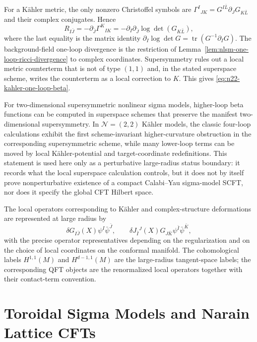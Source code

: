 For a K\"ahler metric, the only nonzero Christoffel symbols are
\(\Gamma^I{}_{JK}=G^{I\bar L}\partial_JG_{K\bar L}\) and their complex
conjugates.  Hence
\[
  R_{I\bar J}
  =
  -\partial_{\bar J}\Gamma^K{}_{IK}
  =
  -\partial_I\partial_{\bar J}\log\det(G_{K\bar L}),
\]
where the last equality is the matrix identity
\(\partial_I\log\det G=\operatorname{tr}(G^{-1}\partial_IG)\).  The
background-field one-loop divergence is the restriction of
Lemma~\ref{lem:nlsm-one-loop-ricci-divergence} to complex
coordinates.  Supersymmetry rules out a local metric counterterm that is not
of type \((1,1)\) and, in the stated superspace scheme, writes the
counterterm as a local correction to \(K\).  This gives
\eqref{eq:n22-kahler-one-loop-beta}.

\begin{remark}
\label{rem:supersymmetric-nlsm-higher-loop-status}
For two-dimensional supersymmetric nonlinear sigma models, higher-loop beta
functions can be computed in superspace schemes that preserve the manifest
two-dimensional supersymmetry.  In \(\mathcal N=(2,2)\) K\"ahler models, the
classic four-loop calculations exhibit the first scheme-invariant
higher-curvature obstruction in the corresponding supersymmetric scheme,
while many lower-loop terms can be moved by local K\"ahler-potential and
target-coordinate redefinitions.  This statement is used here only as a
perturbative large-radius status boundary: it records what the local
superspace calculation controls, but it does not by itself prove
nonperturbative existence of a compact Calabi--Yau sigma-model SCFT, nor
does it specify the global CFT Hilbert space.
\end{remark}

The local operators corresponding to K\"ahler and complex-structure
deformations are represented at large radius by
\[
  \delta G_{I\bar J}(X)\psi^I\bar\psi^{\bar J},
  \qquad
  \delta J_{\bar I}{}^J(X)G_{J\bar K}\psi^{\bar I}\bar\psi^{\bar K},
\]
with the precise operator representatives depending on the regularization
and on the choice of local coordinates on the conformal manifold.  The
cohomological labels \(H^{1,1}(M)\) and \(H^{d-1,1}(M)\) are the
large-radius tangent-space labels; the corresponding QFT objects are the
renormalized local operators together with their contact-term convention.

\section{Toroidal Sigma Models and Narain Lattice CFTs}
\label{sec:toroidal-narain-lattice-cfts}

